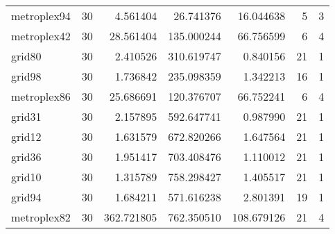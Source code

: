 \begin{longtable}{|l|r|r|r|r|r|r|}
metroplex94 & 30 & 4.561404 & 26.741376 & 16.044638 & 5 & 3 \\
metroplex42 & 30 & 28.561404 & 135.000244 & 66.756599 & 6 & 4 \\
grid80 & 30 & 2.410526 & 310.619747 & 0.840156 & 21 & 1 \\
grid98 & 30 & 1.736842 & 235.098359 & 1.342213 & 16 & 1 \\
metroplex86 & 30 & 25.686691 & 120.376707 & 66.752241 & 6 & 4 \\
grid31 & 30 & 2.157895 & 592.647741 & 0.987990 & 21 & 1 \\
grid12 & 30 & 1.631579 & 672.820266 & 1.647564 & 21 & 1 \\
grid36 & 30 & 1.951417 & 703.408476 & 1.110012 & 21 & 1 \\
grid10 & 30 & 1.315789 & 758.298427 & 1.405517 & 21 & 1 \\
grid94 & 30 & 1.684211 & 571.616238 & 2.801391 & 19 & 1 \\
metroplex82 & 30 & 362.721805 & 762.350510 & 108.679126 & 21 & 4 \\
\end{longtable}
